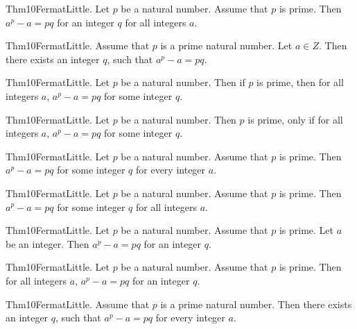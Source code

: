 \documentclass{article}
\begin{document}
Thm10FermatLittle. Let $p$ be a natural number. Assume that $p$ is prime. Then $a ^ {p}- a = p q$ for an integer $q$ for all integers $a$.

Thm10FermatLittle. Assume that $p$ is a prime natural number. Let $a \in Z$. Then there exists an integer $q$, such that $a ^ {p}- a = p q$.

Thm10FermatLittle. Let $p$ be a natural number. Then if $p$ is prime, then for all integers $a$, $a ^ {p}- a = p q$ for some integer $q$.

Thm10FermatLittle. Let $p$ be a natural number. Then $p$ is prime, only if for all integers $a$, $a ^ {p}- a = p q$ for some integer $q$.

Thm10FermatLittle. Let $p$ be a natural number. Assume that $p$ is prime. Then $a ^ {p}- a = p q$ for some integer $q$ for every integer $a$.

Thm10FermatLittle. Let $p$ be a natural number. Assume that $p$ is prime. Then $a ^ {p}- a = p q$ for some integer $q$ for all integers $a$.

Thm10FermatLittle. Let $p$ be a natural number. Assume that $p$ is prime. Let $a$ be an integer. Then $a ^ {p}- a = p q$ for an integer $q$.

Thm10FermatLittle. Let $p$ be a natural number. Assume that $p$ is prime. Then for all integers $a$, $a ^ {p}- a = p q$ for an integer $q$.

Thm10FermatLittle. Assume that $p$ is a prime natural number. Then there exists an integer $q$, such that $a ^ {p}- a = p q$ for every integer $a$.
\end{document}
